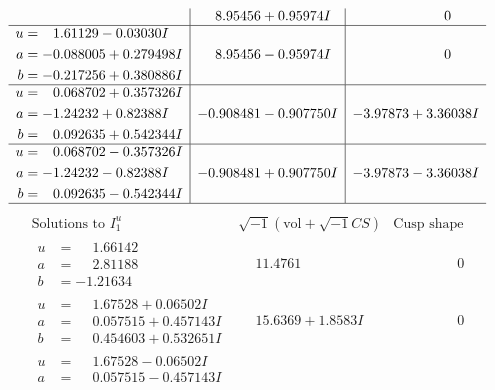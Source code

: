 \documentclass[1p]{elsarticle_modified}
\theoremstyle{definition}
\newcommand{\I}{\sqrt{-1}}
\begin{document}
$$\begin{array}{c|c|c}
 & \phantom{-}8.95456 + 0.95974 I & \phantom{-0.000000 } 0 \\ \hline\begin{aligned}
u &= \phantom{-}1.61129 - 0.03030 I \\
a &= -0.088005 + 0.279498 I \\
b &= -0.217256 + 0.380886 I\end{aligned}
 & \phantom{-}8.95456 - 0.95974 I & \phantom{-0.000000 } 0 \\ \hline\begin{aligned}
u &= \phantom{-}0.068702 + 0.357326 I \\
a &= -1.24232 + 0.82388 I \\
b &= \phantom{-}0.092635 + 0.542344 I\end{aligned}
 & -0.908481 - 0.907750 I & -3.97873 + 3.36038 I \\ \hline\begin{aligned}
u &= \phantom{-}0.068702 - 0.357326 I \\
a &= -1.24232 - 0.82388 I \\
b &= \phantom{-}0.092635 - 0.542344 I\end{aligned}
 & -0.908481 + 0.907750 I & -3.97873 - 3.36038 I\\
 \hline 
 \end{array}$$\newpage$$\begin{array}{c|c|c}  
\text{Solutions to }I^u_{1}& \I (\text{vol} + \sqrt{-1}CS) & \text{Cusp shape}\\
 \hline 
\begin{aligned}
u &= \phantom{-}1.66142\phantom{ +0.000000I} \\
a &= \phantom{-}2.81188\phantom{ +0.000000I} \\
b &= -1.21634\phantom{ +0.000000I}\end{aligned}
 & \phantom{-}11.4761\phantom{ +0.000000I} & \phantom{-0.000000 } 0 \\ \hline\begin{aligned}
u &= \phantom{-}1.67528 + 0.06502 I \\
a &= \phantom{-}0.057515 + 0.457143 I \\
b &= \phantom{-}0.454603 + 0.532651 I\end{aligned}
 & \phantom{-}15.6369 + 1.8583 I & \phantom{-0.000000 } 0 \\ \hline\begin{aligned}
u &= \phantom{-}1.67528 - 0.06502 I \\
a &= \phantom{-}0.057515 - 0.457143 I \\

\end{aligned}
\end{array}$$
\end{document}
